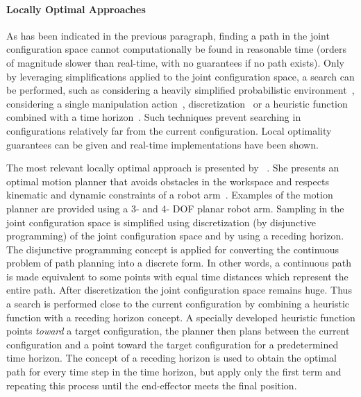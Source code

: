 \paragraph{Locally Optimal Approaches}
As has been indicated in the previous paragraph, finding a path in the joint configuration space cannot computationally be found in reasonable time (orders of magnitude slower than real-time, with no guarantees if no path exists). Only by leveraging simplifications applied to the joint configuration space, a search can be performed, such as considering a heavily simplified probabilistic environment~\cite{vandenberg_path_2009}, considering a single manipulation action~\cite{berenson_manipulation_2009}, discretization~\cite{sabbaghnovin_optimal_2016} or a heuristic function combined with a time horizon~\cite{sabbaghnovin_optimal_2016}. Such techniques prevent searching in configurations relatively far from the current configuration. Local optimality guarantees can be given and real-time implementations have been shown.\bs

The most relevant locally optimal approach is presented by \citeauthor{sabbaghnovin_model_2021}~\cite{sabbaghnovin_model_2021}. She presents an optimal motion planner that avoids obstacles in the workspace and respects kinematic and dynamic constraints of a robot arm~\cite{sabbaghnovin_optimal_2016}. Examples of the motion planner are provided using a 3- and 4- \ac{DOF} planar robot arm. Sampling in the joint configuration space is simplified using discretization (by disjunctive programming) of the joint configuration space and by using a receding horizon. The disjunctive programming concept is applied for converting the continuous problem of path planning into a discrete form. In other words, a continuous path is made equivalent to some points with equal time distances which represent the entire path. After discretization the joint configuration space remains huge. Thus a search is performed close to the current configuration by combining a heuristic function with a receding horizon concept. A specially developed heuristic function points \textit{toward} a target configuration, the planner then plans between the current configuration and a point toward the target configuration for a predetermined time horizon. The concept of a receding horizon is used to obtain the optimal path for every time step in the time horizon, but apply only the first term and repeating this process until the end-effector meets the final position.\bs

